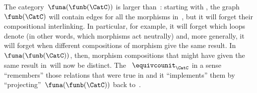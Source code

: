 \begin{example}
The category~$\funa(\funb(\CatC))$ is larger than~\CatC: starting with \CatC, the graph~$\funb(\CatC)$ will contain edges for all the morphisms in~\CatC, but it will forget their compositional interlinking.
In particular, for example, it will forget which loops denote  (in other words, which morphisms act neutrally) and, more generally, it will forget when different compositions of morphism give the same result.
In~$\funa(\funb(\CatC))$, then, morphism compositions that might have given the same result in~\CatC will now be distinct.
The ~$\equivcounit_{\CatC}$ in a sense ``remembers'' those relations that were true in \CatC and it ``implements'' them by ``projecting''~$\funa(\funb(\CatC))$ back to~\CatC.
\end{example}
